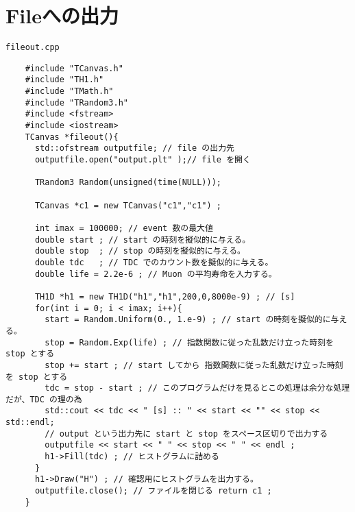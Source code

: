 \clearpage
 \section{Fileへの出力}

 \begin{itembox}{\texttt{fileout.cpp}}
\begin{verbatim}
	#include "TCanvas.h"
	#include "TH1.h"
	#include "TMath.h"
	#include "TRandom3.h"
	#include <fstream>
	#include <iostream>
	TCanvas *fileout(){
	  std::ofstream outputfile; // file の出力先
	  outputfile.open("output.plt" );// file を開く

	  TRandom3 Random(unsigned(time(NULL)));

	  TCanvas *c1 = new TCanvas("c1","c1") ;

	  int imax = 100000; // event 数の最大値
	  double start ; // start の時刻を擬似的に与える。 
	  double stop  ; // stop の時刻を擬似的に与える。 
	  double tdc   ; // TDC でのカウント数を擬似的に与える。
	  double life = 2.2e-6 ; // Muon の平均寿命を入力する。

	  TH1D *h1 = new TH1D("h1","h1",200,0,8000e-9) ; // [s]
	  for(int i = 0; i < imax; i++){
	    start = Random.Uniform(0., 1.e-9) ; // start の時刻を擬似的に与える。
	    stop = Random.Exp(life) ; // 指数関数に従った乱数だけ立った時刻を stop とする
	    stop += start ; // start してから 指数関数に従った乱数だけ立った時刻を stop とする
	    tdc = stop - start ; // このプログラムだけを見るとこの処理は余分な処理だが、TDC の理の為
	    std::cout << tdc << " [s] :: " << start << "" << stop << std::endl;
	    // output という出力先に start と stop をスペース区切りで出力する
	    outputfile << start << " " << stop << " " << endl ;
	    h1->Fill(tdc) ; // ヒストグラムに詰める
	  }
	  h1->Draw("H") ; // 確認用にヒストグラムを出力する。
	  outputfile.close(); // ファイルを閉じる return c1 ;
	}
\end{verbatim}
 \end{itembox}


